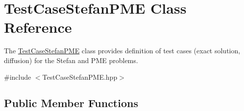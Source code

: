 \hypertarget{classTestCaseStefanPME}{}\section{Test\+Case\+Stefan\+P\+ME Class Reference}
\label{classTestCaseStefanPME}


The \hyperlink{classTestCaseStefanPME}{Test\+Case\+Stefan\+P\+ME} class provides definition of test cases (exact solution, diffusion) for the Stefan and P\+ME problems.  




{\ttfamily \#include $<$Test\+Case\+Stefan\+P\+M\+E.\+hpp$>$}

\subsection*{Public Member Functions}
